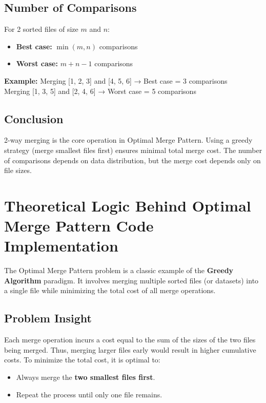 \documentclass[14pt]{extarticle}
\begin{document}
\subsection*{Number of Comparisons}
For 2 sorted files of size $m$ and $n$:
\begin{itemize}
    \item \textbf{Best case:} $\min(m, n)$ comparisons
    \item \textbf{Worst case:} $m + n - 1$ comparisons
\end{itemize}

\textbf{Example:} Merging [1, 2, 3] and [4, 5, 6] → Best case = 3 comparisons\\
Merging [1, 3, 5] and [2, 4, 6] → Worst case = 5 comparisons

\subsection*{Conclusion}
2-way merging is the core operation in Optimal Merge Pattern. Using a greedy strategy (merge smallest files first) ensures minimal total merge cost. The number of comparisons depends on data distribution, but the merge cost depends only on file sizes.



\section{Theoretical Logic Behind Optimal Merge Pattern Code Implementation}

The Optimal Merge Pattern problem is a classic example of the \textbf{Greedy Algorithm} paradigm. It involves merging multiple sorted files (or datasets) into a single file while minimizing the total cost of all merge operations.

\subsection*{Problem Insight}
Each merge operation incurs a cost equal to the sum of the sizes of the two files being merged. Thus, merging larger files early would result in higher cumulative costs. To minimize the total cost, it is optimal to:

\begin{itemize}
    \item Always merge the \textbf{two smallest files first}.
    \item Repeat the process until only one file remains.
\end{itemize}
\end{document}
